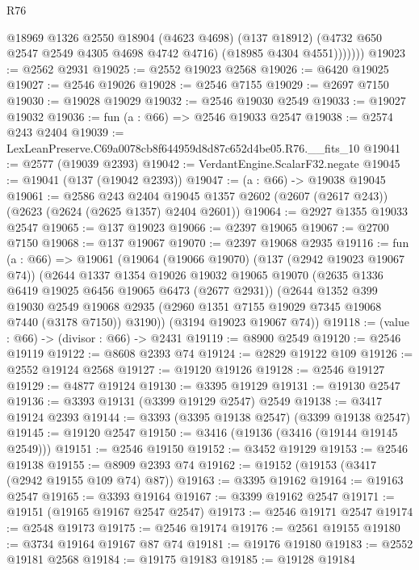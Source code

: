 \begin{lexlean}{R76}
\begin{coremodule}
              @18969
                @1326
                @2550
                @18904
                (@4623 @4698)
                (@137 @18912)
                (@4732 @650 @2547 @2549 @4305 @4698 @4742 @4716)
                (@18985 @4304 @4551)))))))
@19023 := @2562 @2931
@19025 := @2552 @19023 @2568
@19026 := @6420 @19025
@19027 := @2546 @19026
@19028 := @2546 @7155
@19029 := @2697 @7150
@19030 := @19028 @19029
@19032 := @2546 @19030 @2549
@19033 := @19027 @19032
@19036 := fun (a : @66) => @2546 @19033 @2547
@19038 := @2574 @243 @2404
@19039 := LexLeanPreserve.C69a0078cb8f644959d8d87c652d4be05.R76.__fits_10
@19041 := @2577 (@19039 @2393)
@19042 := VerdantEngine.ScalarF32.negate
@19045 := @19041 (@137 (@19042 @2393))
@19047 := (a : @66) -> @19038 @19045
@19061 := @2586
    @243
    @2404
    @19045
    @1357
    @2602
    (@2607 (@2617 @243))
    (@2623 (@2624 (@2625 @1357) @2404 @2601))
@19064 := @2927 @1355 @19033 @2547
@19065 := @137 @19023
@19066 := @2397 @19065
@19067 := @2700 @7150
@19068 := @137 @19067
@19070 := @2397 @19068 @2935
@19116 := fun (a : @66) =>
  @19061
    (@19064
      (@19066 @19070)
      (@137 (@2942 @19023 @19067 @74))
      (@2644
        @1337
        @1354
        @19026
        @19032
        @19065
        @19070
        (@2635 @1336 @6419 @19025 @6456 @19065 @6473 (@2677 @2931))
        (@2644
          @1352
          @399
          @19030
          @2549
          @19068
          @2935
          (@2960 @1351 @7155 @19029 @7345 @19068 @7440 (@3178 @7150))
          @3190))
      (@3194 @19023 @19067 @74))
@19118 := (value : @66) -> (divisor : @66) -> @2431
@19119 := @8900 @2549
@19120 := @2546 @19119
@19122 := @8608 @2393 @74
@19124 := @2829 @19122 @109
@19126 := @2552 @19124 @2568
@19127 := @19120 @19126
@19128 := @2546 @19127
@19129 := @4877 @19124
@19130 := @3395 @19129
@19131 := @19130 @2547
@19136 := @3393 @19131 (@3399 @19129 @2547) @2549
@19138 := @3417 @19124 @2393
@19144 := @3393 (@3395 @19138 @2547) (@3399 @19138 @2547)
@19145 := @19120 @2547
@19150 := @3416 (@19136 (@3416 (@19144 @19145 @2549)))
@19151 := @2546 @19150
@19152 := @3452 @19129
@19153 := @2546 @19138
@19155 := @8909 @2393 @74
@19162 := @19152 (@19153 (@3417 (@2942 @19155 @109 @74) @87))
@19163 := @3395 @19162
@19164 := @19163 @2547
@19165 := @3393 @19164
@19167 := @3399 @19162 @2547
@19171 := @19151 (@19165 @19167 @2547 @2547)
@19173 := @2546 @19171 @2547
@19174 := @2548 @19173
@19175 := @2546 @19174
@19176 := @2561 @19155
@19180 := @3734 @19164 @19167 @87 @74
@19181 := @19176 @19180
@19183 := @2552 @19181 @2568
@19184 := @19175 @19183
@19185 := @19128 @19184

\end{coremodule}
\end{lexlean}
